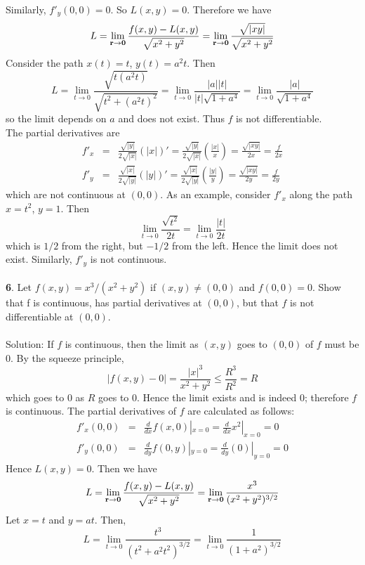 \documentclass[12pt]{amsbook}
\begin{document}
Similarly, $f'_y(0,0)=0$. So $L(x,y)=0$. Therefore we have
$$L=\lim_{{\bf r}\rightarrow {\bf 0}}\frac{f(x,y)-L(x,y)}{\sqrt{x^2+y^2}}=\lim_{{\bf r}\rightarrow {\bf 0}}\frac{\sqrt{|xy|}}{\sqrt{x^2+y^2}}$$
Consider the path $x(t)=t$, $y(t)=a^2t$. Then 
$$L=\lim_{t \rightarrow 0}\frac{\sqrt{t(a^2t)}}{\sqrt{t^2+(a^2t)^2}}=\lim_{t \rightarrow 0}\frac{|a||t|}{|t|\sqrt{1+a^4}}=\lim_{t \rightarrow 0}\frac{|a|}{\sqrt{1+a^4}}$$
so the limit depends on $a$ and does not exist. Thus $f$ is not differentiable.
\\
The partial derivatives are
\begin{eqnarray*}
f'_x&=&\frac{\sqrt{|y|}}{2\sqrt{|x|}}(|x|)'=\frac{\sqrt{|y|}}{2\sqrt{|x|}}(\frac{|x|}{x})=\frac{\sqrt{|xy|}}{2x}=\frac{f}{2x} \\
f'_y&=&\frac{\sqrt{|x|}}{2\sqrt{|y|}}(|y|)'=\frac{\sqrt{|x|}}{2\sqrt{|y|}}(\frac{|y|}{y})=\frac{\sqrt{|xy|}}{2y}=\frac{f}{2y}
\end{eqnarray*}
which are not continuous at $(0,0)$. As an example, consider $f'_x$ along the path $x=t^2$, $y=1$. Then
$$\lim_{t \rightarrow 0}\frac{\sqrt{t^2}}{2t}=\lim_{t \rightarrow 0}\frac{|t|}{2t}$$
which is $1/2$ from the right, but $-1/2$ from the left. Hence the limit does not exist. Similarly, $f'_y$ is not continuous.
\\
\\
{\small\bf 6}. Let $f(x,y)=x^3/(x^2+y^2)$ if $(x,y)\neq (0,0)$ and $f(0, 0) = 0$. Show that f
is continuous, has partial derivatives at $(0, 0)$, but that $f$ is not differentiable
at $(0, 0)$.
\\
\\
{\sc Solution}: If $f$ is continuous, then the limit as $(x,y)$ goes to $(0,0)$ of $f$ must be $0$. By the squeeze principle,
$$|f(x,y)-0|=\frac{|x|^3}{x^2+y^2}\leq \frac{R^3}{R^2}=R$$
which goes to $0$ as $R$ goes to $0$. Hence the limit exists and is indeed $0$; therefore $f$ is continuous. The partial derivatives of $f$ are calculated as follows:
\begin{eqnarray*}
f'_x(0,0)&=&\frac{d}{dx}f(x,0)|_{x=0}=\frac{d}{dx}x^2|_{x=0}=0 \\
f'_y(0,0)&=&\frac{d}{dy}f(0,y)|_{y=0}=\frac{d}{dy}(0)|_{y=0}=0
\end{eqnarray*}
Hence $L(x,y)=0$. Then we have
$$L=\lim_{{\bf r} \rightarrow {\bf 0}}\frac{f(x,y)-L(x,y)}{\sqrt{x^2+y^2}}=\lim_{{\bf r} \rightarrow {\bf 0}}\frac{x^3}{(x^2+y^2)^{3/2}}$$
Let $x=t$ and $y=at$. Then,
$$L=\lim_{t \rightarrow 0}\frac{t^3}{(t^2+a^2t^2)^{3/2}}=\lim_{t \rightarrow 0}\frac{1}{(1+a^2)^{3/2}}$$
\end{document}
